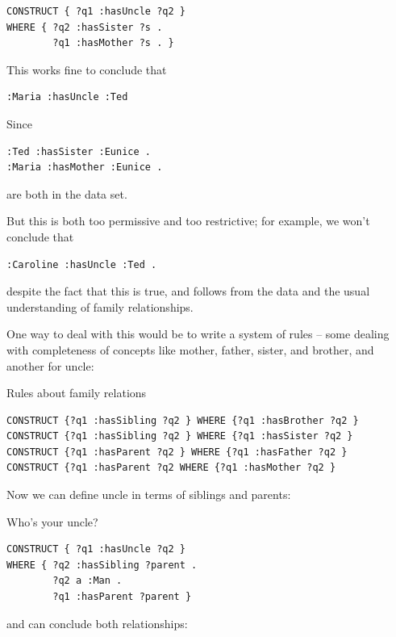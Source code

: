 \begin{lstlisting}
CONSTRUCT { ?q1 :hasUncle ?q2 }
WHERE { ?q2 :hasSister ?s .
        ?q1 :hasMother ?s . }
\end{lstlisting}

This works fine to conclude that

\begin{lstlisting}
:Maria :hasUncle :Ted 
\end{lstlisting}

Since

\begin{lstlisting}
:Ted :hasSister :Eunice .
:Maria :hasMother :Eunice .
\end{lstlisting}

are both in the data set. 

But this is both too permissive and too restrictive; for example, we
won't conclude that

\begin{lstlisting}
:Caroline :hasUncle :Ted .
\end{lstlisting}

despite the fact that this is true, and follows from the data and the usual understanding of family relationships.


One way to deal with this would be to write a system of rules -- some
dealing with completeness of concepts like mother, father, sister, and
brother, and another for uncle:

\begin{query}Rules about family relations\end{query}
\begin{lstlisting}
CONSTRUCT {?q1 :hasSibling ?q2 } WHERE {?q1 :hasBrother ?q2 }
CONSTRUCT {?q1 :hasSibling ?q2 } WHERE {?q1 :hasSister ?q2 }
CONSTRUCT {?q1 :hasParent ?q2 } WHERE {?q1 :hasFather ?q2 }
CONSTRUCT {?q1 :hasParent ?q2 WHERE {?q1 :hasMother ?q2 }
\end{lstlisting}

Now we can define uncle in terms of siblings and parents:

\begin{query}Who's your uncle?\end{query}
\begin{lstlisting}
CONSTRUCT { ?q1 :hasUncle ?q2 }
WHERE { ?q2 :hasSibling ?parent .
        ?q2 a :Man .
        ?q1 :hasParent ?parent }
\end{lstlisting}


and can conclude both relationships:

